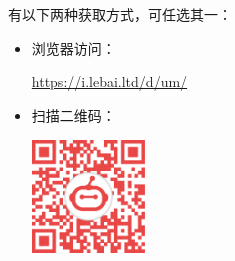 \chapter*{\eBook}
\thispagestyle{empty}
{
\small

\setlength\parindent{0pt}

{\eBook}有以下两种获取方式，可任选其一：

\vspace*{1em}

\begin{itemize}
    \item 浏览器访问：

    \begin{center}
    \centering
    \url{https://i.lebai.ltd/d/um/}
    \qquad
    \end{center}

    \vspace*{1em}

    \item 扫描二维码：

\begin{center}
    \includegraphics[width=3cm]{image/qr_code.pdf}
    \qquad
\end{center}

\end{itemize}
}